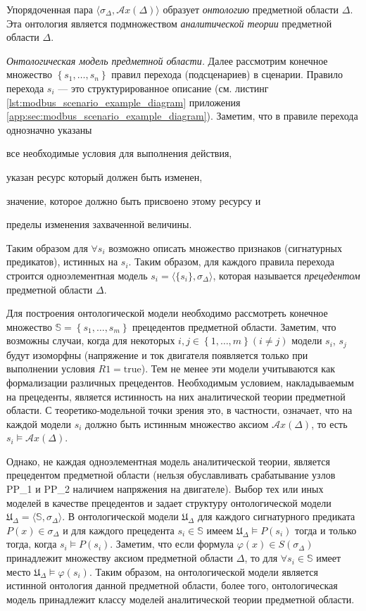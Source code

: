 Упорядоченная пара $\langle\sigma_\Delta, \mathcal{A}x(\Delta)\rangle$ образует \textit{онтологию} предметной области $\Delta$.
Эта онтология является подмножеством \textit{аналитической теории} предметной области $\Delta$.


\textit{Онтологическая модель предметной области.}
Далее рассмотрим конечное множество $\left\{ s_1, \ldots, s_n \right\}$ правил перехода (подсценариев) в сценарии.
Правило перехода $s_i$ --- это структурированное описание (см. листинг \ref{lst:modbus_scenario_example_diagram} приложения \ref{app:sec:modbus_scenario_example_diagram}).
Заметим, что в правиле перехода однозначно указаны 
\begin{enumerate*}[label=\arabic*\upshape)]
    \item все необходимые условия для выполнения действия,
    \item указан ресурс который должен быть изменен,
    \item значение, которое должно быть присвоено этому ресурсу и
    \item пределы изменения захваченной величины.
\end{enumerate*}
Таким образом для $\forall s_i$ возможно описать множество признаков (сигнатурных предикатов), истинных на $s_i$.
Таким образом, для каждого правила перехода строится одноэлементная модель $s_i = \langle \{s_i\}, \sigma_\Delta \rangle$,
которая называется \textit{прецедентом} предметной области $\Delta$.

Для построения онтологической модели необходимо рассмотреть конечное множество 
$\mathbb{S}=\left\{ s_1, \ldots, s_m \right\}$ прецедентов предметной области.
Заметим, что возможны случаи, когда для некоторых $i,j \in \left\{1,\ldots,m\right\} (i\ne j)$
модели $s_i$, $s_j$ будут изоморфны (напряжение и ток двигателя появляется только при выполнении условия $R1 = \mbox{true}$).
Тем не менее эти модели учитываются как формализации различных прецедентов.
Необходимым условием, накладываемым на прецеденты, является истинность на них аналитической теории предметной области.
С теоретико-модельной точки зрения это, в частности, означает, что на каждой модели $s_i$ должно быть истинным множество аксиом
$\mathcal{A}x(\Delta)$, то есть $s_i \vDash \mathcal{A}x(\Delta)$.

Однако, не каждая одноэлементная модель аналитической теории, является прецедентом предметной
области (нельзя обуславливать срабатывание узлов PP\_1 и PP\_2 наличием напряжения на двигателе).
Выбор тех или иных моделей в качестве прецедентов и задает структуру онтологической модели
$\mathfrak{U}_\Delta =\langle \mathbb{S}, \sigma_\Delta \rangle$.
В онтологической модели $\mathfrak{U}_\Delta$ для каждого сигнатурного предиката $P(x) \in \sigma_\Delta$
и для каждого прецедента $s_i \in \mathbb{S}$ имеем $\mathfrak{U}_\Delta \vDash P(s_i)$
тогда и только тогда, когда $s_i \vDash P(s_i)$.
Заметим, что если формула $\varphi(x) \in S(\sigma_\Delta)$ принадлежит множеству аксиом предметной
области $\Delta$, то для $\forall s_i \in \mathbb{S}$  имеет место $\mathfrak{U}_\Delta \vDash\varphi(s_i)$.
Таким образом, на онтологической модели является истинной онтология данной предметной области,
более того, онтологическая модель принадлежит классу моделей аналитической теории предметной области.

